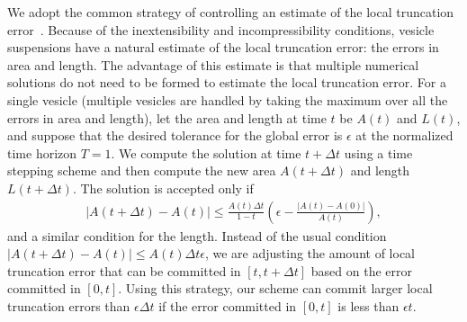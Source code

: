 \documentclass[3p,times,procedia]{elsarticle}
\begin{document}
We adopt the common strategy of controlling an estimate of the local
truncation error~\cite{hai:nor:wan1993}.  Because of the
inextensibility and incompressibility conditions, vesicle suspensions
have a natural estimate of the local truncation error: the errors in
area and length.  The advantage of this estimate is that multiple
numerical solutions do not need to be formed to estimate the local
truncation error.  For a single vesicle (multiple vesicles are handled
by taking the maximum over all the errors in area and length), let the
area and length at time $t$ be $A(t)$ and $L(t)$, and suppose that the
desired tolerance for the global error is $\epsilon$ at the normalized
time horizon $T=1$.  We compute the solution at time $t+\Delta t$ using
a time stepping scheme and then compute the new area $A(t + \Delta t)$
and length $L(t + \Delta t)$.  The solution is accepted only if
\begin{align}
  |A(t+\Delta t) - A(t)| \leq \frac{A(t) \Delta t}{1-t} 
  \left(\epsilon - \frac{|A(t) - A(0)|}{A(t)}\right),
  \label{e:errorBounds}
\end{align}
and a similar condition for the length.  Instead of the usual condition
$|A(t+\Delta t) - A(t)| \leq A(t) \Delta t \epsilon$, we are adjusting
the amount of local truncation error that can be committed in
$[t,t+\Delta t]$ based on the error committed in $[0,t]$.  Using this
strategy, our scheme can commit larger local truncation errors than
$\epsilon \Delta t$ if the error committed in $[0,t]$ is less than
$\epsilon t$.
\end{document}
